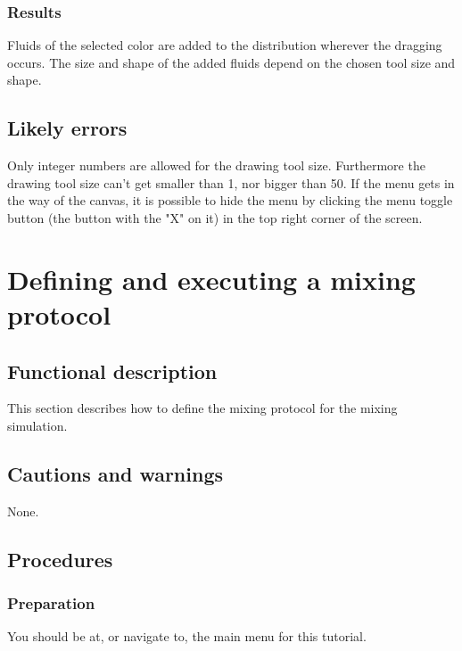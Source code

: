 \subsubsection{Results}
Fluids of the selected color are added to the distribution wherever the dragging occurs. The size and shape of the added fluids depend on the chosen tool size and shape.

\subsection{Likely errors}
Only integer numbers are allowed for the drawing tool size. Furthermore the drawing tool size can't get smaller than 1, nor bigger than 50. If the menu gets in the way of the canvas, it is possible to hide the menu by clicking the menu toggle button (the button with the "X" on it) in the top right corner of the screen.


\section{Defining and executing a mixing protocol}
\label{sec:defineMixProt}

\subsection{Functional description}
This section describes how to define the mixing protocol for the mixing simulation.

\subsection{Cautions and warnings}
None.

\subsection{Procedures}
\subsubsection{Preparation}
%
You should be at, or navigate to, the main menu for this tutorial.

